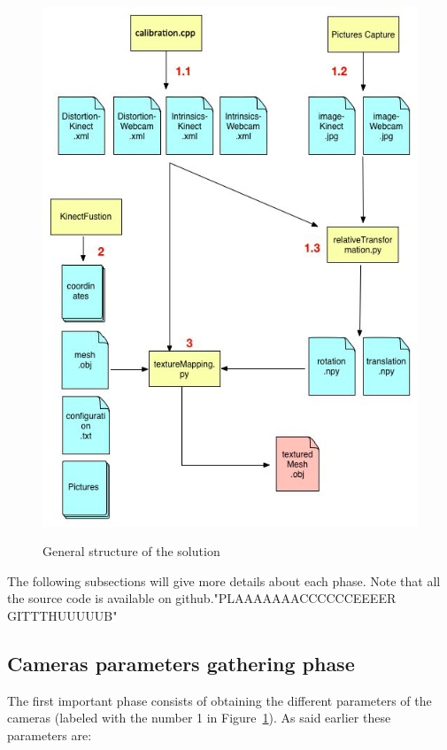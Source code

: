 \begin{figure}
\caption{General structure of the solution}
\centering
    \includegraphics[width=1.0\textwidth]{images/workflow.jpg}
\label{fig:workflow}
\end{figure}

The following subsections will give more details about each phase. Note that all the source code is available on github."PLAAAAAAACCCCCCEEEER GITTTHUUUUUB"

\subsection{Cameras parameters gathering phase}
\label{sec:Cameras parameters gathering phase} 
The first important phase consists of obtaining the different parameters of the cameras (labeled with the number 1 in Figure~\ref{fig:workflow}). As said earlier these parameters are:\\

